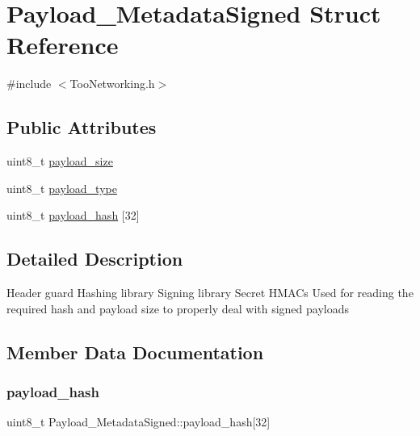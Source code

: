 \hypertarget{structPayload__MetadataSigned}{}\section{Payload\+\_\+\+Metadata\+Signed Struct Reference}
\label{structPayload__MetadataSigned}


{\ttfamily \#include $<$Too\+Networking.\+h$>$}

\subsection*{Public Attributes}
\begin{DoxyCompactItemize}
\item 
uint8\+\_\+t \hyperlink{structPayload__MetadataSigned_acc293d1cef4a0c121149eb68a834b4ea}{payload\+\_\+size}
\item 
uint8\+\_\+t \hyperlink{structPayload__MetadataSigned_a05467542863d8bfb345c11f8ccefd852}{payload\+\_\+type}
\item 
uint8\+\_\+t \hyperlink{structPayload__MetadataSigned_af6ce9dd70fb4b4cff4a317388d6e7c98}{payload\+\_\+hash} \mbox{[}32\mbox{]}
\end{DoxyCompactItemize}


\subsection{Detailed Description}
Header guard Hashing library Signing library Secret H\+M\+A\+Cs Used for reading the required hash and payload size to properly deal with signed payloads 

\subsection{Member Data Documentation}
\mbox{\label{structPayload__MetadataSigned_af6ce9dd70fb4b4cff4a317388d6e7c98}} 
\subsubsection{\texorpdfstring{payload\+\_\+hash}{payload\_hash}}
{\footnotesize\ttfamily uint8\+\_\+t Payload\+\_\+\+Metadata\+Signed\+::payload\+\_\+hash\mbox{[}32\mbox{]}}

